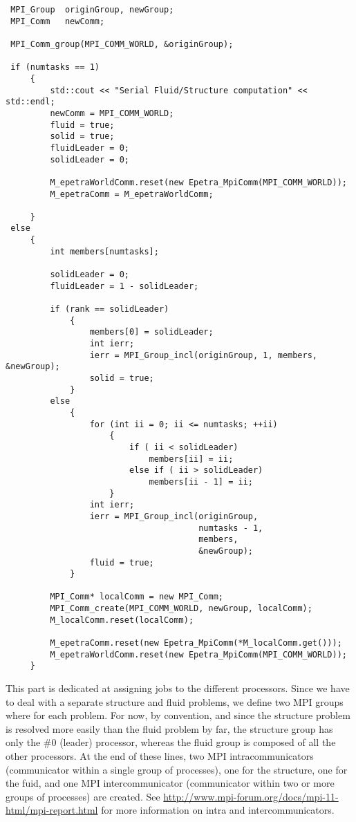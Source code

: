 \begin{verbatim}
 MPI_Group  originGroup, newGroup;
 MPI_Comm   newComm;

 MPI_Comm_group(MPI_COMM_WORLD, &originGroup);

 if (numtasks == 1)
     {
         std::cout << "Serial Fluid/Structure computation" << std::endl;
         newComm = MPI_COMM_WORLD;
         fluid = true;
         solid = true;
         fluidLeader = 0;
         solidLeader = 0;

         M_epetraWorldComm.reset(new Epetra_MpiComm(MPI_COMM_WORLD));
         M_epetraComm = M_epetraWorldComm;

     }
 else
     {
         int members[numtasks];

         solidLeader = 0;
         fluidLeader = 1 - solidLeader;

         if (rank == solidLeader)
             {
                 members[0] = solidLeader;
                 int ierr;
                 ierr = MPI_Group_incl(originGroup, 1, members, &newGroup);
                 solid = true;
             }
         else
             {
                 for (int ii = 0; ii <= numtasks; ++ii)
                     {
                         if ( ii < solidLeader)
                             members[ii] = ii;
                         else if ( ii > solidLeader)
                             members[ii - 1] = ii;
                     }
                 int ierr;
                 ierr = MPI_Group_incl(originGroup,
                                       numtasks - 1,
                                       members,
                                       &newGroup);
                 fluid = true;
             }

         MPI_Comm* localComm = new MPI_Comm;
         MPI_Comm_create(MPI_COMM_WORLD, newGroup, localComm);
         M_localComm.reset(localComm);

         M_epetraComm.reset(new Epetra_MpiComm(*M_localComm.get()));
         M_epetraWorldComm.reset(new Epetra_MpiComm(MPI_COMM_WORLD));
     }

\end{verbatim}

This part is dedicated at assigning jobs to the different processors. Since we have to deal
with a separate structure and fluid problems, we define two MPI groups where for each problem.
For now, by convention, and since the structure problem is resolved more easily than the
fluid problem by far, the structure group has only the \#0 (leader) processor, whereas the fluid group is
composed of all the other processors. At the end of these lines, two MPI intracommunicators
(communicator within a single group of processes), one for the structure,
one for the fuid, and one MPI intercommunicator (communicator within two or
more groups of processes) are created. See \url{http://www.mpi-forum.org/docs/mpi-11-html/mpi-report.html}
for more information on intra and intercommunicators.

